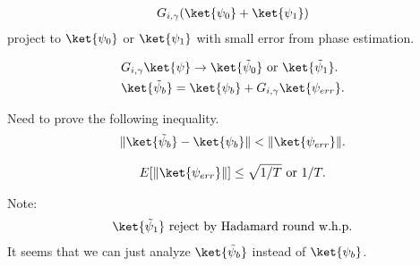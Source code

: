 \begin{align*}
    G_{i,\gamma} (\ket{\psi_0} + \ket{\psi_1}) 
\end{align*}
project to $\ket{\psi_0}$ or $\ket{\psi_1}$ with small error from phase estimation. 

\begin{align*}
    &G_{i,\gamma} \ket{\psi} \rightarrow \ket{\tilde{\psi}_0}\mbox{ or }\ket{\tilde{\psi}_1}.\\ 
    &\ket{\tilde{\psi}_b} = \ket{\psi_b}+G_{i,\gamma}\ket{\psi_{err}}.
\end{align*}

Need to prove the following inequality. 
\begin{align*}
    \|\ket{\tilde{\psi}_b} - \ket{\psi_b}\|<\|\ket{\psi_{err}}\|.
\end{align*}

\begin{align*}
    E[\|\ket{\psi_{err}}\|] \leq \sqrt{1/T} \mbox{ or } 1/T. 
\end{align*}

Note: 
\begin{align*}
    \ket{\tilde{\psi}_1}\mbox{ reject by Hadamard round w.h.p}. 
\end{align*}
It seems that we can just analyze $\ket{\tilde{\psi}_b}$ instead of $\ket{\psi_b}$. 




